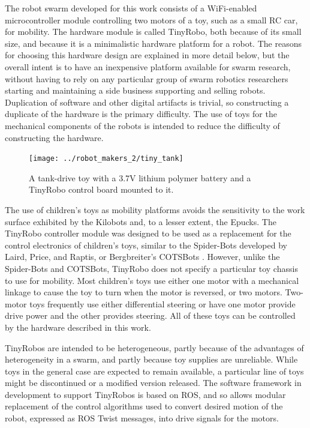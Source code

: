 \documentclass[]{article}
\begin{document}
The robot swarm developed for this work consists of a WiFi-enabled microcontroller module controlling two motors of a toy, such as a small RC car, for mobility. 
The hardware module is called TinyRobo, both because of its small size, and because it is a minimalistic hardware platform for a robot. 
The reasons for choosing this hardware design are explained in more detail below, but the overall intent is to have an inexpensive platform available for swarm research, without having to rely on any particular group of swarm robotics researchers starting and maintaining a side business supporting and selling robots.
Duplication of software and other digital artifacts is trivial, so constructing a duplicate of the hardware is the primary difficulty. 
The use of toys for the mechanical components of the robots is intended to reduce the difficulty of constructing the hardware. 

\begin{figure}
\centering
\texttt{[image: ../robot\_makers\_2/tiny\_tank]}
\caption{A tank-drive toy with a 3.7V lithium polymer battery and a TinyRobo control board mounted to it.}
\end{figure}

The use of children's toys as mobility platforms avoids the sensitivity to the work surface exhibited by the Kilobots and, to a lesser extent, the Epucks.
The TinyRobo controller module was designed to be used as a replacement for the control electronics of children's toys, similar to the Spider-Bots developed by Laird, Price, and Raptis, or Bergbreiter's COTSBots \cite{lairdspider, bergbreiter2003cotsbots}.
However, unlike the Spider-Bots and COTSBots, TinyRobo does not specify a particular toy chassis to use for mobility. 
Most children's toys use either one motor with a mechanical linkage to cause the toy to turn when the motor is reversed, or two motors.
Two-motor toys frequently use either differential steering or have one motor provide drive power and the other provides steering. 
All of these toys can be controlled by the hardware described in this work. 

TinyRobos are intended to be heterogeneous, partly because of the advantages of heterogeneity in a swarm, and partly because toy supplies are unreliable.
While toys in the general case are expected to remain available, a particular line of toys might be discontinued or a modified version released. 
The software framework in development to support TinyRobos is based on ROS, and so allows modular replacement of the control algorithms used to convert desired motion of the robot, expressed as ROS Twist messages, into drive signals for the motors. 
\end{document}
